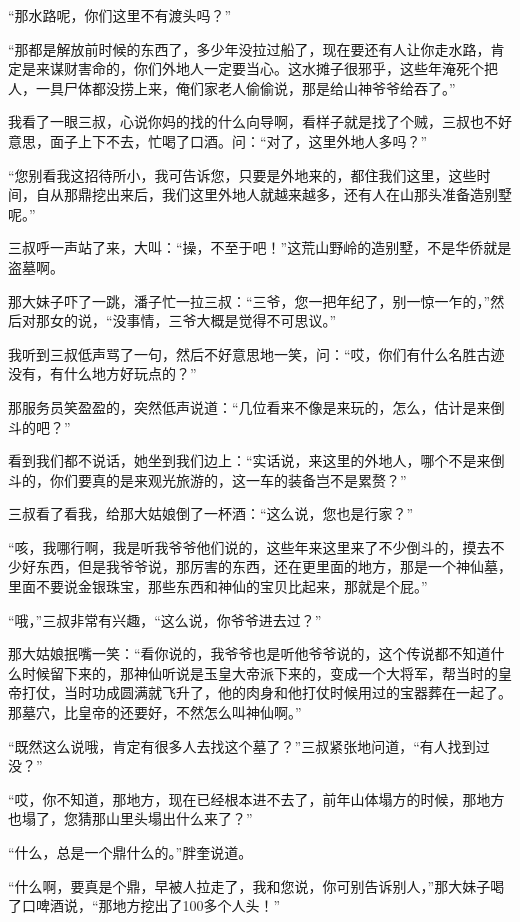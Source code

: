 “那水路呢，你们这里不有渡头吗？”

“那都是解放前时候的东西了，多少年没拉过船了，现在要还有人让你走水路，肯定是来谋财害命的，你们外地人一定要当心。这水摊子很邪乎，这些年淹死个把人，一具尸体都没捞上来，俺们家老人偷偷说，那是给山神爷爷给吞了。”

我看了一眼三叔，心说你妈的找的什么向导啊，看样子就是找了个贼，三叔也不好意思，面子上下不去，忙喝了口酒。问：“对了，这里外地人多吗？”

“您别看我这招待所小，我可告诉您，只要是外地来的，都住我们这里，这些时间，自从那鼎挖出来后，我们这里外地人就越来越多，还有人在山那头准备造别墅呢。”

三叔呼一声站了来，大叫：“操，不至于吧！”这荒山野岭的造别墅，不是华侨就是盗墓啊。

那大妹子吓了一跳，潘子忙一拉三叔：“三爷，您一把年纪了，别一惊一乍的，”然后对那女的说，“没事情，三爷大概是觉得不可思议。”

我听到三叔低声骂了一句，然后不好意思地一笑，问：“哎，你们有什么名胜古迹没有，有什么地方好玩点的？”

那服务员笑盈盈的，突然低声说道：“几位看来不像是来玩的，怎么，估计是来倒斗的吧？”

看到我们都不说话，她坐到我们边上：“实话说，来这里的外地人，哪个不是来倒斗的，你们要真的是来观光旅游的，这一车的装备岂不是累赘？”

三叔看了看我，给那大姑娘倒了一杯酒：“这么说，您也是行家？”

“咳，我哪行啊，我是听我爷爷他们说的，这些年来这里来了不少倒斗的，摸去不少好东西，但是我爷爷说，那厉害的东西，还在更里面的地方，那是一个神仙墓，里面不要说金银珠宝，那些东西和神仙的宝贝比起来，那就是个屁。”

“哦，”三叔非常有兴趣，“这么说，你爷爷进去过？”

那大姑娘抿嘴一笑：“看你说的，我爷爷也是听他爷爷说的，这个传说都不知道什么时候留下来的，那神仙听说是玉皇大帝派下来的，变成一个大将军，帮当时的皇帝打仗，当时功成圆满就飞升了，他的肉身和他打仗时候用过的宝器葬在一起了。那墓穴，比皇帝的还要好，不然怎么叫神仙啊。”

“既然这么说哦，肯定有很多人去找这个墓了？”三叔紧张地问道，“有人找到过没？”

“哎，你不知道，那地方，现在已经根本进不去了，前年山体塌方的时候，那地方也塌了，您猜那山里头塌出什么来了？”

“什么，总是一个鼎什么的。”胖奎说道。

“什么啊，要真是个鼎，早被人拉走了，我和您说，你可别告诉别人，”那大妹子喝了口啤酒说，“那地方挖出了100多个人头！”

